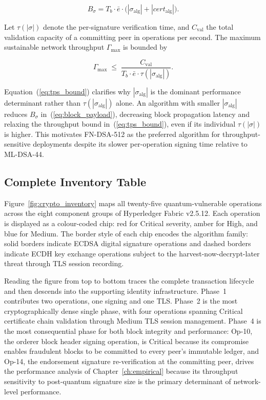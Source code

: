 \documentclass[conference]{IEEEtran}
\begin{document}
\begin{equation}
B_{\sigma} = T_b \cdot \bar{e} \cdot
\bigl(|\sigma_{\mathrm{alg}}| + |\mathit{cert}_{\mathrm{alg}}|\bigr).
\label{eq:block_payload}
\end{equation}

Let $\tau(|\sigma|)$ denote the per-signature verification time, and
$C_{\mathrm{val}}$ the total validation capacity of a committing peer in
operations per second. The maximum sustainable network throughput
$\Gamma_{\max}$ is bounded by

\begin{equation}
\Gamma_{\max} \;\leq\; \frac{C_{\mathrm{val}}}{T_b \cdot \bar{e} \cdot
\tau(|\sigma_{\mathrm{alg}}|)}.
\label{eq:tps_bound}
\end{equation}

Equation~(\ref{eq:tps_bound}) clarifies why $|\sigma_{\mathrm{alg}}|$
is the dominant performance determinant rather than
$\tau(|\sigma_{\mathrm{alg}}|)$ alone. An algorithm with smaller
$|\sigma_{\mathrm{alg}}|$ reduces $B_{\sigma}$ in~(\ref{eq:block_payload}),
decreasing block propagation latency and relaxing the throughput bound
in~(\ref{eq:tps_bound}), even if its individual $\tau(|\sigma|)$ is
higher. This motivates FN-DSA-512 as the preferred algorithm for
throughput-sensitive deployments despite its slower per-operation
signing time relative to ML-DSA-44.

\subsection{Complete Inventory Table}

Figure~\ref{fig:crypto_inventory} maps all twenty-five
quantum-vulnerable operations across the eight component groups of
Hyperledger Fabric v2.5.12. Each operation is displayed as a colour-coded
chip: red for Critical severity, amber for High, and blue for Medium. The
border style of each chip encodes the algorithm family: solid borders
indicate ECDSA digital signature operations and dashed borders indicate
ECDH key exchange operations subject to the harvest-now-decrypt-later
threat through TLS session recording.

Reading the figure from top to bottom traces the complete transaction
lifecycle and then descends into the supporting identity infrastructure.
Phase~1 contributes two operations, one signing and one TLS. Phase~2
is the most cryptographically dense single phase, with four operations
spanning Critical certificate chain validation through Medium TLS session
management. Phase~4 is the most consequential phase for both block
integrity and performance: Op-10, the orderer block header signing
operation, is Critical because its compromise enables fraudulent blocks
to be committed to every peer's immutable ledger, and Op-14, the
endorsement signature re-verification at the committing peer, drives the
performance analysis of Chapter~\ref{ch:empirical} because its throughput
sensitivity to post-quantum signature size is the primary determinant of
network-level performance.
\end{document}
